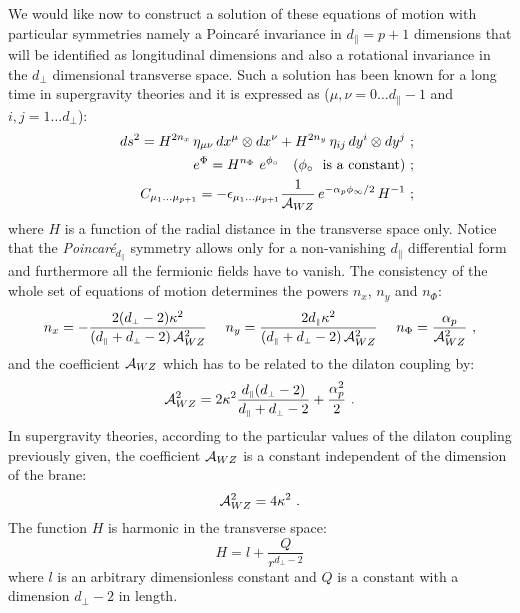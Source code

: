 \documentclass[a4paper,12pt]{article}
\def\dpar{d_{\scriptscriptstyle\parallel}}
\def\dperp{d_{\scriptscriptstyle\perp}}
\begin{document}
We would like now to construct a solution of these equations of motion
with particular symmetries namely
a Poincar\'e invariance in $\dpar=p+1$ dimensions that will be identified as longitudinal
dimensions and also a rotational invariance in the $\dperp$ dimensional
transverse space. Such a solution has been known for a long time in supergravity
theories and it is expressed as ($\mu,\nu=0\ldots \dpar-1$ and $i,j=1\ldots \dperp$):
%
\begin{eqnarray}
&&
ds^2  =
H^{2 n_x} \, \eta_{\mu\nu} \, dx^\mu \otimes dx^\nu
+ H^{2 n_y} \,\eta_{ij} \, dy^i \otimes dy^j  \ ;
\\
&&
e^{\Phi}  =
H^{n_\Phi} \ e^{\phi_\circ} \ \ \
(\phi_\circ \ \mbox{ is a constant}) \ ;
\\
&&
C_{\mu_1\ldots\mu_{p+1}} =
- \epsilon_{\mu_1 \ldots \mu_{p+1}}
\frac{1}{{\cal A}_{WZ}}\,
e^{-\alpha_p \phi_\infty /2}\,  H^{-1} \ ;
\end{eqnarray}
%
where $H$ is a function of the radial distance in the transverse space only.
Notice that the {\it Poincar\'e}$_{\dpar}$ symmetry allows only for a non-vanishing
$\dpar$ differential form and furthermore all the fermionic fields have to vanish.
The consistency of the whole set of equations of motion determines the powers
$n_x$, $n_y$ and $n_\Phi$:
%
\begin{equation}
	\label{eq:powers}
n_x = -\frac{2 (\dperp-2)\kappa^2}{(\dpar+\dperp-2)\, {\cal A}_{WZ}^2}
\ \ \ \
n_y =   \frac{2 \dpar \kappa^2}{(\dpar+\dperp-2)\, {\cal A}_{WZ}^2}
\ \ \ \
n_\Phi = \frac{\alpha_p}{{\cal A}_{WZ}^2} \ ,
\end{equation}
%
and the coefficient ${\cal A}_{WZ}$ which has to be related to the dilaton
coupling by:
%
\begin{equation}
	\label{eq:WZ}
{\cal A}_{WZ}^2 = 2 \kappa^2 \frac{\dpar(\dperp-2)}{\dpar+\dperp-2}
+ \frac{\alpha_p^2}{2} \ .
\end{equation}
%
In supergravity theories, according to the particular values of the dilaton
coupling previously given, the coefficient ${\cal A}_{WZ}$ is a constant
independent of the dimension of the brane:
%
\begin{equation}
{\cal A}_{WZ}^2 = 4 \kappa^2 \ .
\end{equation}
%
The function $H$ is harmonic in the transverse space:
%
\begin{equation}
	\label{eq:H}
H =  l +  \frac{Q}{r^{\dperp-2}}
\end{equation}
%
where $l$ is an arbitrary dimensionless constant and $Q$ is a constant with
a dimension $\dperp-2$ in length.
\end{document}
